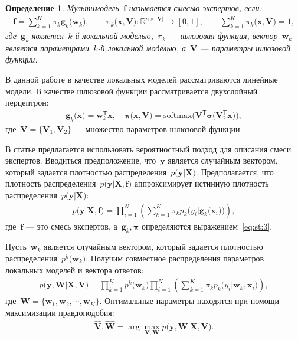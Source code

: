 \documentclass[12pt, twoside]{article}
\newtheorem{definition}{Определение}[section]
\numberwithin{equation}{section}
\begin{document}
\begin{definition}
\label{def:2}
Мультимодель~$\mathbf{f}$ называется смесью экспертов, если:
\[
\label{eq:st:2}
\begin{aligned}
\mathbf{f} = \sum_{k=1}^{K}\pi_{k}\mathbf{g}_k\bigr(\mathbf{w}_k\bigr), \qquad \pi_{k}\bigr(\mathbf{x}, \mathbf{V}\bigr):\mathbb{R}^{n\times \left|\mathbf{V}\right|} \to [0, 1], \qquad \sum_{k=1}^{K}\pi_{k}\bigr(\mathbf{x}, \mathbf{V}\bigr) = 1,
\end{aligned}
\]
где~$\mathbf{g}_k$ является~$k$-й локальной моделью,~$\pi_k$ --- шлюзовая функция, вектор~$\mathbf{w}_k$ является параметрами~$k$-й локальной моделью, а~$\mathbf{V}$ --- параметры шлюзовой функции.
\end{definition}

В данной работе в качестве локальных моделей рассматриваются линейные модели. В качестве шлюзовой функции рассматривается двухслойный перцептрон:
\[
\label{eq:st:3}
\begin{aligned}
\mathbf{g}_k\bigr(\textbf{x}\bigr) = \textbf{w}_k^{\mathsf{T}}\textbf{x}, \quad
\bm{\pi}\bigr(\mathbf{x}, \mathbf{V}\bigr) = \text{softmax}\bigr(\mathbf{V}_{1}^{\mathsf{T}}\bm{\sigma}\bigr(\mathbf{V}_2^{\mathsf{T}}\mathbf{x}\bigr)\bigr),
\end{aligned}
\]
где~$\mathbf{V} = \bigr\{\mathbf{V}_1, \mathbf{V}_2\bigr\}$ --- множество параметров шлюзовой функции.

В статье предлагается использовать вероятностный подход для описания смеси экспертов. Вводиться предположение, что~$\textbf{y}$ является случайным вектором, который задается плотностью распределения~$p\bigr(\textbf{y}|\textbf{X}\bigr)$. Предполагается, что плотность распределения~$p\bigr(\textbf{y}|\textbf{X}, \textbf{f}\bigr)$ аппроксимирует истинную плотность распределения~$p\bigr(\textbf{y}|\textbf{X}\bigr)$:
\[
\label{eq:st:new:1}
\begin{aligned}
p\bigr(\textbf{y}|\textbf{X}, \textbf{f}\bigr) = \prod_{i=1}^{N}\left(\sum_{k=1}^{K}\pi_kp_{k}\bigr(y_{i}|\textbf{g}_{k}\bigr(\mathbf{x}_{i}\bigr)\bigr)\right),
\end{aligned}
\]
где~$\textbf{f}$ --- это смесь экспертов, а~$\textbf{g}_k, \bm{\pi}$ определяются выражением~\eqref{eq:st:3}.

Пусть~$\textbf{w}_k$ является случайным вектором, который задается плотностью распределения~$p^{k}\bigr(\mathbf{w}_k\bigr)$. Получим совместное распределения параметров локальных моделей и вектора ответов:
\[
\label{eq:st:4}
\begin{aligned}
p\bigr(\mathbf{y}, \mathbf{W}|\mathbf{X}, \mathbf{V}\bigr) = \prod_{k=1}^{K}p^{k}\bigr(\mathbf{w}_k\bigr)\prod_{i=1}^{N}\left(\sum_{k=1}^{K}\pi_{k}p_{k}\bigr(y_i|\mathbf{w}_k, \mathbf{x}_i\bigr)\right),
\end{aligned}
\]
где~$\mathbf{W} = \bigr\{\mathbf{w}_1, \mathbf{w}_2, \cdots, \mathbf{w}_K\bigr\}.$
Оптимальные параметры находятся при помощи максимизации правдоподобия:
\[
\label{eq:st:5}
\begin{aligned}
\hat{\mathbf{V}}, \hat{ \mathbf{W}} = \arg\max_{\mathbf{V}, \mathbf{W}} p\bigr(\mathbf{y},  \mathbf{W}|\mathbf{X}, \mathbf{V}\bigr).
\end{aligned}
\]
\end{document}
